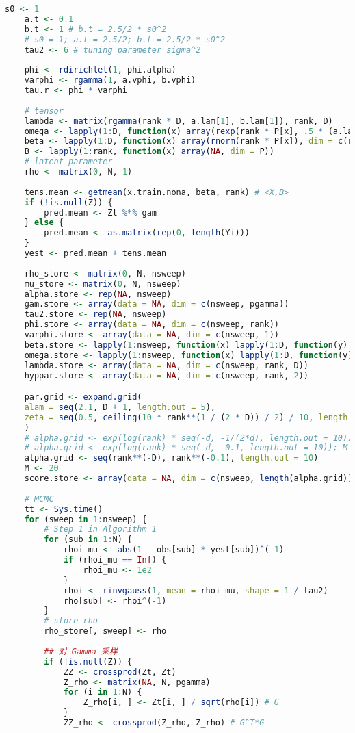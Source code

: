 \documentclass[AutoFakeBold]{LZUThesis}
\begin{document}
\begin{lstlisting}[language=R, caption = {BT-SVM}算法]
	s0 <- 1
	a.t <- 0.1
	b.t <- 1 # b.t = 2.5/2 * s0^2
	# s0 = 1; a.t = 2.5/2; b.t = 2.5/2 * s0^2
	tau2 <- 6 # tuning parameter sigma^2
	
	phi <- rdirichlet(1, phi.alpha)
	varphi <- rgamma(1, a.vphi, b.vphi)
	tau.r <- phi * varphi
	
	# tensor
	lambda <- matrix(rgamma(rank * D, a.lam[1], b.lam[1]), rank, D)
	omega <- lapply(1:D, function(x) array(rexp(rank * P[x], .5 * (a.lam[1] / b.lam[1])), dim = c(rank, P[x])))
	beta <- lapply(1:D, function(x) array(rnorm(rank * P[x]), dim = c(rank, P[x])))
	B <- lapply(1:rank, function(x) array(NA, dim = P))
	# latent parameter
	rho <- matrix(0, N, 1)
	
	tens.mean <- getmean(x.train.nona, beta, rank) # <X,B>
	if (!is.null(Z)) {
		pred.mean <- Zt %*% gam
	} else {
		pred.mean <- as.matrix(rep(0, length(Yi)))
	}
	yest <- pred.mean + tens.mean
	
	rho_store <- matrix(0, N, nsweep)
	mu_store <- matrix(0, N, nsweep)
	alpha.store <- rep(NA, nsweep)
	gam.store <- array(data = NA, dim = c(nsweep, pgamma))
	tau2.store <- rep(NA, nsweep)
	phi.store <- array(data = NA, dim = c(nsweep, rank))
	varphi.store <- array(data = NA, dim = c(nsweep, 1))
	beta.store <- lapply(1:nsweep, function(x) lapply(1:D, function(y) array(dim = c(rank, P[y]))))
	omega.store <- lapply(1:nsweep, function(x) lapply(1:D, function(y) array(dim = c(rank, P[y]))))
	lambda.store <- array(data = NA, dim = c(nsweep, rank, D))
	hyppar.store <- array(data = NA, dim = c(nsweep, rank, 2))

	par.grid <- expand.grid(
	alam = seq(2.1, D + 1, length.out = 5),
	zeta = seq(0.5, ceiling(10 * rank**(1 / (2 * D)) / 2) / 10, length.out = 5)
	)
	# alpha.grid <- exp(log(rank) * seq(-d, -1/(2*d), length.out = 10)); M <- 10
	# alpha.grid <- exp(log(rank) * seq(-d, -0.1, length.out = 10)); M <- 20
	alpha.grid <- seq(rank**(-D), rank**(-0.1), length.out = 10)
	M <- 20
	score.store <- array(data = NA, dim = c(nsweep, length(alpha.grid)))
	
	# MCMC
	tt <- Sys.time()
	for (sweep in 1:nsweep) {	
		# Step 1 in Algorithm 1
		for (sub in 1:N) {
			rhoi_mu <- abs(1 - obs[sub] * yest[sub])^(-1)
			if (rhoi_mu == Inf) {
				rhoi_mu <- 1e2
			}
			rhoi <- rinvgauss(1, mean = rhoi_mu, shape = 1 / tau2)
			rho[sub] <- rhoi^(-1)
		}
		# store rho
		rho_store[, sweep] <- rho
		
		## 对 Gamma 采样
		if (!is.null(Z)) {
			ZZ <- crossprod(Zt, Zt)
			Z_rho <- matrix(NA, N, pgamma)
			for (i in 1:N) {
				Z_rho[i, ] <- Zt[i, ] / sqrt(rho[i]) # G
			}
			ZZ_rho <- crossprod(Z_rho, Z_rho) # G^T*G
			

\end{lstlisting}
\end{document}
